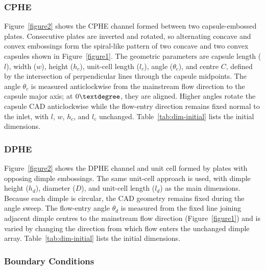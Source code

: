 \documentclass[energies,article,submit,moreauthors,noheaderline]{Definitions/mdpi}
\newcommand{\degree}{\texorpdfstring{\ensuremath{^\circ}}{\textdegree}}
\def\ensuremath#1{}%
\def\degree{\textdegree}%
\begin{document}
\subsubsection{CPHE}
\label{sec:cphe_geometry}

Figure~\ref{figure2} shows the CPHE channel formed between two capsule-embossed plates. Consecutive plates are inverted and rotated, so alternating concave and convex embossings form the spiral-like pattern of two concave and two convex capsules shown in Figure~\ref{figure1}. The geometric parameters are capsule length ($l$), width ($w$), height ($h_c$), unit-cell length ($l_c$), angle ($\theta_c$), and centre $C$, defined by the intersection of perpendicular lines through the capsule midpoints. The angle $\theta_c$ is measured anticlockwise from the mainstream flow direction to the capsule major axis; at $0\degree$, they are aligned. Higher angles rotate the capsule CAD anticlockwise while the flow-entry direction remains fixed normal to the inlet, with $l$, $w$, $h_c$, and $l_c$ unchanged. Table~\ref{tab:dim-initial} lists the initial dimensions.

\subsubsection{DPHE}
\label{sec:dphe_geometry}

Figure~\ref{figure2} shows the DPHE channel and unit cell formed by plates with opposing dimple embossings. The same unit-cell approach is used, with dimple height ($h_d$), diameter ($D$), and unit-cell length ($l_d$) as the main dimensions. Because each dimple is circular, the CAD geometry remains fixed during the angle sweep. The flow-entry angle $\theta_d$ is measured from the fixed line joining adjacent dimple centres to the mainstream flow direction (Figure~\ref{figure1}) and is varied by changing the direction from which flow enters the unchanged dimple array. Table~\ref{tab:dim-initial} lists the initial dimensions.

\subsubsection{Boundary Conditions}
\label{sec:periodic_boundary}
\end{document}
